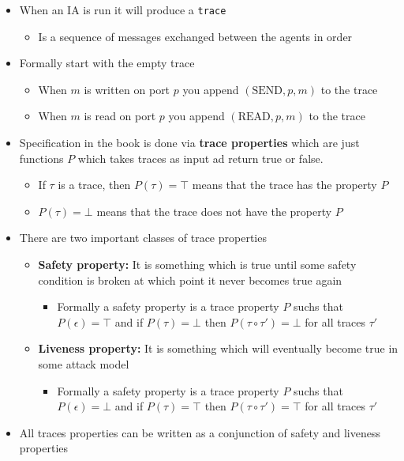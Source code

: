 \documentclass[11pt]{article}
\begin{document}
\begin{itemize}
\item When an IA is run it will produce a \texttt{trace}
\begin{itemize}
\item Is a sequence of messages exchanged between the agents in order
\end{itemize}

\item Formally start with the empty trace
\begin{itemize}
\item When \(m\) is written on port \(p\) you append \((\text{SEND},p,m)\) to the trace
\item When \(m\) is read on port \(p\) you append \((\text{READ}, p, m)\) to the trace
\end{itemize}

\item Specification in the book is done via \textbf{trace properties} which are just functions \(P\) which takes traces as input ad return true or false.
\begin{itemize}
\item If \(\tau\) is a trace, then \(P(\tau) = \top\) means that the trace has the property \(P\)
\item \(P(\tau) = \bot\) means that the trace does not have the property \(P\)
\end{itemize}

\item There are two important classes of trace properties
\begin{itemize}
\item \textbf{Safety property:} It is something which is true until some safety condition is broken at which point it never becomes true again	
\begin{itemize}
\item Formally a safety property is a trace property \(P\) suchs that \(P(\epsilon) = \top\) and if \(P(\tau) = \bot\) then \(P(\tau \circ \tau') = \bot\) for all traces \(\tau'\)
\end{itemize}
\item \textbf{Liveness property:} It is something which will eventually become true in some attack model
\begin{itemize}
\item Formally a safety property is a trace property \(P\) suchs that \(P(\epsilon) = \bot\) and if \(P(\tau) = \top\) then \(P(\tau \circ \tau') = \top\) for all traces \(\tau'\)
\end{itemize}
\end{itemize}

\item All traces properties can be written as a conjunction of safety and liveness properties
\end{itemize}
\end{document}
